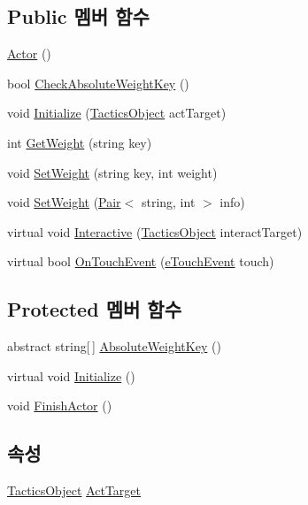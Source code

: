 \subsection*{Public 멤버 함수}
\begin{DoxyCompactItemize}
\item 
\hyperlink{class_m_c_n_1_1_actor_a6a3b8a1620a77b18521d714a7657ab75}{Actor} ()
\item 
bool \hyperlink{class_m_c_n_1_1_actor_a493bb0a37cb9fc5b1aa8507ec69b04ac}{Check\+Absolute\+Weight\+Key} ()
\item 
void \hyperlink{class_m_c_n_1_1_actor_aadb5d1045def818bbcba4cd2248f2f1c}{Initialize} (\hyperlink{class_tactics_object}{Tactics\+Object} act\+Target)
\item 
int \hyperlink{class_m_c_n_1_1_actor_af264703ef93c3c77b5b7062aef828205}{Get\+Weight} (string key)
\item 
void \hyperlink{class_m_c_n_1_1_actor_a8d8020782aefa7fff625f5f8e09f7539}{Set\+Weight} (string key, int weight)
\item 
void \hyperlink{class_m_c_n_1_1_actor_a4337ef4d88c2086f18db4f2e6415eddd}{Set\+Weight} (\hyperlink{class_m_c_n_1_1_pair}{Pair}$<$ string, int $>$ info)
\item 
virtual void \hyperlink{class_m_c_n_1_1_actor_a8ca8f46410f6ee9557e529e22fd6f6d1}{Interactive} (\hyperlink{class_tactics_object}{Tactics\+Object} interact\+Target)
\item 
virtual bool \hyperlink{class_m_c_n_1_1_actor_a4891cf321e2a9ee25fd618c19b785331}{On\+Touch\+Event} (\hyperlink{_touch_manager_8cs_ae33e321a424fe84ba8b2fdb81ad40a68}{e\+Touch\+Event} touch)
\end{DoxyCompactItemize}
\subsection*{Protected 멤버 함수}
\begin{DoxyCompactItemize}
\item 
abstract string\mbox{[}$\,$\mbox{]} \hyperlink{class_m_c_n_1_1_actor_a54340ddb597852fbb6e9f2a35663bbc5}{Absolute\+Weight\+Key} ()
\item 
virtual void \hyperlink{class_m_c_n_1_1_actor_a37e76fad4625e138478764ae6c5ce959}{Initialize} ()
\item 
void \hyperlink{class_m_c_n_1_1_actor_ae86279ca7d290707cd010bc411f38966}{Finish\+Actor} ()
\end{DoxyCompactItemize}
\subsection*{속성}
\begin{DoxyCompactItemize}
\item 
\hyperlink{class_tactics_object}{Tactics\+Object} \hyperlink{class_m_c_n_1_1_actor_a4e2e573370bb52bb747f77d4c75dc7e1}{Act\+Target}
\end{DoxyCompactItemize}

